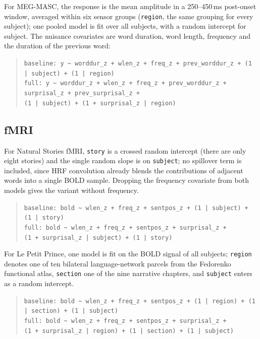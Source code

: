 For MEG-MASC, the response is the mean amplitude in a 250--450\,ms post-onset window, averaged within six sensor groups (\texttt{region}, the same grouping for every subject); one pooled model is fit over all subjects, with a random intercept for subject. The nuisance covariates are word duration, word length, frequency and the duration of the previous word:
\begin{quote}
\texttt{baseline:\ y \textasciitilde\ worddur\_z + wlen\_z + freq\_z + prev\_worddur\_z + (1 | subject) + (1 | region)}\\
\texttt{full:\ y \textasciitilde\ worddur\_z + wlen\_z + freq\_z + prev\_worddur\_z + surprisal\_z + prev\_surprisal\_z +}\\
\texttt{\phantom{full:\ y \textasciitilde\ }(1 | subject) + (1 + surprisal\_z | region)}
\end{quote}

\subsection{fMRI}

For Natural Stories fMRI, \texttt{story} is a crossed random intercept (there are only eight stories) and the single random slope is on \texttt{subject}; no spillover term is included, since HRF convolution already blends the contributions of adjacent words into a single BOLD sample. Dropping the frequency covariate from both models gives the variant without frequency.
\begin{quote}
\texttt{baseline:\ bold \textasciitilde\ wlen\_z + freq\_z + sentpos\_z + (1 | subject) + (1 | story)}\\
\texttt{full:\ bold \textasciitilde\ wlen\_z + freq\_z + sentpos\_z + surprisal\_z +}\\
\texttt{\phantom{full:\ bold \textasciitilde\ }(1 + surprisal\_z | subject) + (1 | story)}
\end{quote}

For Le Petit Prince, one model is fit on the BOLD signal of all subjects; \texttt{region} denotes one of ten bilateral language-network parcels from the Fedorenko functional atlas, \texttt{section} one of the nine narrative chapters, and \texttt{subject} enters as a random intercept.
\begin{quote}
\texttt{baseline:\ bold \textasciitilde\ wlen\_z + freq\_z + sentpos\_z + (1 | region) + (1 | section) + (1 | subject)}\\
\texttt{full:\ bold \textasciitilde\ wlen\_z + freq\_z + sentpos\_z + surprisal\_z +}\\
\texttt{\phantom{full:\ bold \textasciitilde\ }(1 + surprisal\_z | region) + (1 | section) + (1 | subject)}
\end{quote}

